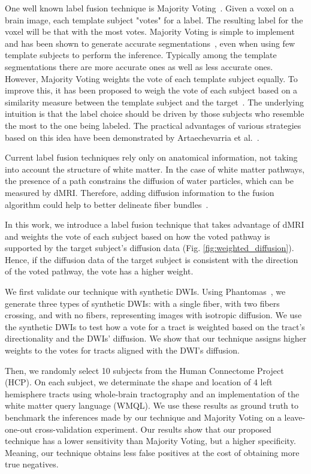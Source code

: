 One well known label fusion technique is Majority Voting~\cite{Xu1992}. Given a
voxel on a brain image, each template subject "votes" for a label. The resulting
label for the voxel will be that with the most votes. Majority Voting is simple to
implement and has been shown to generate accurate segmentations~\cite{Asman2013},
even when using few template subjects to perform the inference.
Typically among the template segmentations there are more accurate ones as well
as less accurate ones\cite{Rohlfing2004}. However, Majority Voting weights the vote of
each template subject equally. To improve this, it has been proposed
to weigh the vote of each subject based on a similarity measure between the
template subject and the target~\cite{Sabuncu2010}. The underlying intuition is
that the label choice should be driven by those subjects who resemble the most
to the one being labeled. The practical advantages of various strategies based
on this idea have been demonstrated by Artaechevarria et al.~\cite{Artaechevarria2009}.

Current label fusion techniques rely only on anatomical information, not taking 
into account the structure of white matter. In the case of white matter pathways,
the presence of a path constrains the diffusion of water particles, which can be
measured by dMRI. Therefore, adding diffusion information to the fusion algorithm
could help to better delineate fiber bundles~\cite{Girard2017}.

In this work, we introduce a label fusion technique that takes advantage of dMRI
and weights the vote of each subject based on how the voted pathway is supported
by the target subject's diffusion data (Fig. \ref{fig:weighted_diffusion}). Hence,
if the diffusion data of the target subject is consistent with the direction of
the voted pathway, the vote has a higher weight.

We first validate our technique with synthetic DWIs. Using Phantomas~\cite{Caruyer2014},
we generate three types of synthetic DWIs: with a single fiber, with two
fibers crossing, and with no fibers, representing images with isotropic
diffusion. We use the synthetic DWIs to test how a vote for a tract is weighted based
on the tract's directionality and the DWIs' diffusion. We show that
our technique assigns higher weights to the votes for tracts aligned with
the DWI's diffusion.

Then, we randomly select 10 subjects from the Human Connectome Project (HCP).
On each subject, we determinate the shape and location of 4 left hemisphere tracts
using whole-brain tractography and an implementation of
the white matter query language (WMQL). We use these results as ground truth to
benchmark the inferences made by our technique and Majority Voting on a leave-one-out
cross-validation experiment. Our results show that our proposed technique has a lower
sensitivity than Majority Voting, but a higher specificity. Meaning, our technique
obtains less false positives at the cost of obtaining more true negatives.

